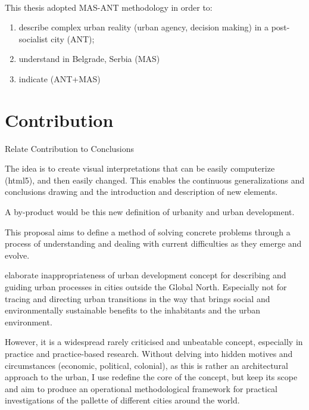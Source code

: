 \documentclass[11pt]{report}
\begin{document}
\\
This thesis adopted MAS-ANT methodology in order to:
\begin{enumerate}
\item describe complex urban reality  (urban agency, decision making)  in a post-socialist city (ANT);
\item understand   in Belgrade, Serbia (MAS)
\item indicate   (ANT+MAS) 
\end{enumerate}

\section{Contribution}

Relate Contribution to Conclusions

The idea is to create visual interpretations that can be easily computerize (html5), and then easily changed. This enables the continuous generalizations and conclusions drawing and the introduction and description of new elements.

A by-product would be this new definition of urbanity and urban development.

This proposal aims to define a method of solving concrete problems through a process of understanding and dealing with current difficulties as they emerge and evolve.

elaborate inappropriateness of urban development concept for describing and guiding urban processes in cities outside the Global North. Especially not for tracing and directing urban transitions in the way that brings social and environmentally sustainable benefits to the inhabitants and the urban environment.

However, it is a widespread rarely criticised and unbeatable concept, especially in practice and practice-based research. Without delving into hidden motives and circumstances (economic, political, colonial), as this is rather an architectural approach to the urban, I use redefine the core of the concept, but keep its scope and aim to produce an operational methodological framework for practical investigations of the pallette of different cities around the world.
\end{document}
